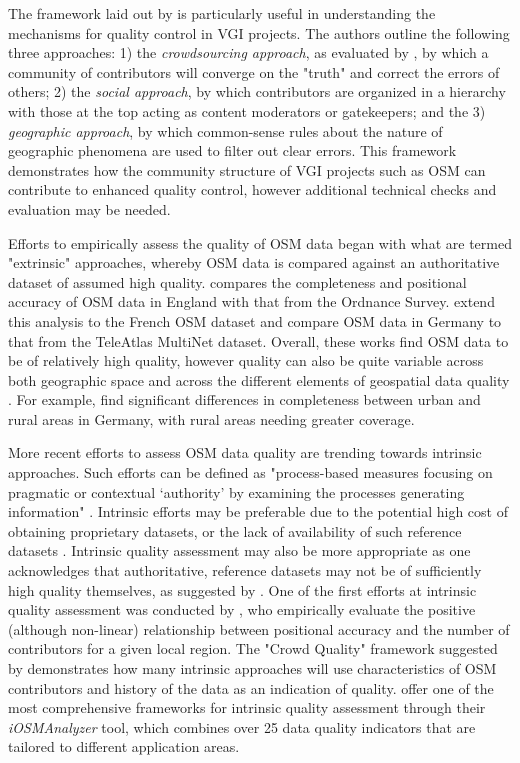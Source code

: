 The framework laid out by \textcite{goodchild_assuring_2012} is particularly useful in understanding the mechanisms for quality control in VGI projects. The authors outline the following three approaches: 1) the \textit{crowdsourcing approach}, as evaluated by \textcite{haklay_how_2010-1}, by which a community of contributors will converge on the "truth" and correct the errors of others; 2) the \textit{social approach}, by which contributors are organized in a hierarchy with those at the top acting as content moderators or gatekeepers; and the 3) \textit{geographic approach}, by which common-sense rules about the nature of geographic phenomena are used to filter out clear errors. This framework demonstrates how the community structure of VGI projects such as OSM can contribute to enhanced quality control, however additional technical checks and evaluation may be needed.

Efforts to empirically assess the quality of OSM data began with what are termed "extrinsic" approaches, whereby OSM data is compared against an authoritative dataset of assumed high quality. \textcite{haklay_how_2010} compares the completeness and positional accuracy of OSM data in England with that from the Ordnance Survey. \textcite{girres_quality_2010} extend this analysis to the French OSM dataset and \textcite{zielstra_comparative_2010} compare OSM data in Germany to that from the TeleAtlas MultiNet dataset. Overall, these works find OSM data to be of relatively high quality, however quality can also be quite variable across both geographic space and across the different elements of geospatial data quality \parencite{girres_quality_2010, haklay_how_2010}. For example, \textcite{zielstra_comparative_2010} find significant differences in completeness between urban and rural areas in Germany, with rural areas needing greater coverage.

More recent efforts to assess OSM data quality are trending towards intrinsic approaches. Such efforts can be defined as "process-based measures focusing on pragmatic or contextual ‘authority’ by examining the processes generating information" \parencite[p. 297]{anderson_crowd_2018}. Intrinsic efforts may be preferable due to the potential high cost of obtaining proprietary datasets, or the lack of availability of such reference datasets \parencite{estes_maps_1994}. Intrinsic quality assessment may also be more appropriate as one acknowledges that authoritative, reference datasets may not be of sufficiently high quality themselves, as suggested by \textcite[p. 112]{goodchild_assuring_2012}. One of the first efforts at intrinsic quality assessment was conducted by \textcite{haklay_how_2010-1}, who empirically evaluate the positive (although non-linear) relationship between positional accuracy and the number of contributors for a given local region. The "Crowd Quality" framework suggested by \textcite{van_exel_impact_2010} demonstrates how many intrinsic approaches will use characteristics of OSM contributors and history of the data as an indication of quality. \textcite{barron_comprehensive_2014} offer one of the most comprehensive frameworks for intrinsic quality assessment through their \textit{iOSMAnalyzer} tool, which combines over 25 data quality indicators that are tailored to different application areas. 

